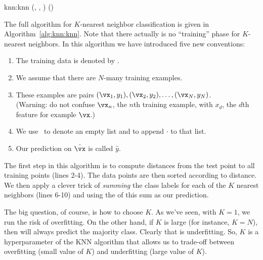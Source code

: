\newalgorithm%
  {knn:knn}%
  {(, , \VAR{$\hat\vx$})}
  {
 
\ENDFOR
{} 
 
 
\ENDFOR
\RETURN {}() 
}

The full algorithm for $K$-nearest neighbor classification is given in
Algorithm~\ref{alg:knn:knn}.  Note that there actually is no
``training'' phase for $K$-nearest neighbors.  In this algorithm we
have introduced five new conventions:

\begin{enumerate}
\item The training data is denoted by .
\item We assume that there are $N$-many training examples.
\item These examples are pairs $(\vx_1,y_1), (\vx_2,y_2), \dots,
  (\vx_N,y_N)$.\\(Warning: do not confuse $\vx_n$, the $n$th training
  example, with $x_d$, the $d$th feature for example $\vx$.)
\item We use \emptylist~to denote an empty list and \pushlist{$\cdot$}
  to append $\cdot$ to that list.
\item Our prediction on $\hat\vx$ is called $\hat y$.
\end{enumerate}

The first step in this algorithm is to compute distances from the test
point to all training points (lines 2-4).  The data points are then
sorted according to distance.  We then apply a clever trick of
\emph{summing} the class labels for each of the $K$ nearest neighbors
(lines 6-10) and using the  of this sum as our prediction.

The big question, of course, is how to choose $K$.  As we've seen,
with $K=1$, we run the risk of overfitting.  On the other hand, if $K$
is large (for instance, $K=N$), then  will always
predict the majority class.  Clearly that is underfitting.  So, $K$ is
a hyperparameter of the KNN algorithm that allows us to trade-off
between overfitting (small value of $K$) and underfitting (large value
of $K$).

